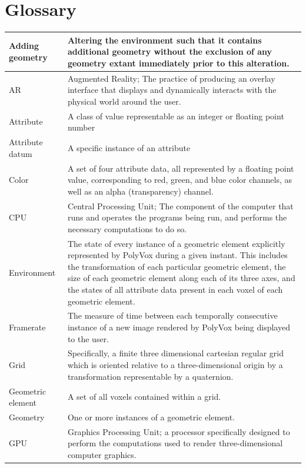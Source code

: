 \documentclass[onecolumn, draftclsnofoot,10pt, compsoc]{IEEEtran}
\begin{document}
\section{Glossary}
\begin{longtable}{ | l | p{12cm} | }
 \hline			
Adding geometry & Altering the environment such that it contains additional geometry without the exclusion of any geometry extant immediately prior to this alteration.  \\ \hline 
AR & Augmented Reality; The practice of producing an overlay interface that displays and dynamically interacts with the physical world around the user. \\ \hline 
Attribute & A class of value representable as an integer or floating point number  \\ \hline
Attribute datum & A specific instance of an attribute  \\ \hline
Color & A set of four attribute data, all represented by a floating point value, corresponding to red, green, and blue color channels, as well as an alpha (transparency) channel.  \\ \hline
CPU & Central Processing Unit; The component of the computer that runs and operates the programs being run, and performs the necessary computations to do so.  \\ \hline
Environment & The state of every instance of a geometric element explicitly represented by PolyVox during a given instant. This includes the transformation of each particular geometric element, the size of each geometric element along each of its three axes, and the states of all attribute data present in each voxel of each geometric element. \\ \hline
Framerate & The measure of time between each temporally consecutive instance of a new image rendered by PolyVox being displayed to the user. \\ \hline 
Grid &  Specifically, a finite three dimensional cartesian regular grid which is oriented relative to a three-dimensional origin by a transformation representable by a quaternion. \\ \hline
Geometric element & A set of all voxels contained within a grid.  \\ \hline
Geometry & One or more instances of a geometric element.  \\ \hline
GPU & Graphics Processing Unit; a processor specifically designed to perform the computations used to render three-dimensional computer graphics.  \\ \hline

\end{longtable}
\end{document}
